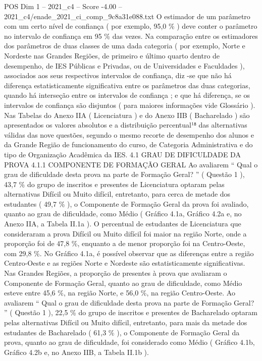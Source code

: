 \begin{textsample}{POS Dim 1 – 2021\_c4 – Score -4.00 – 2021\_c4/enade\_2021\_ci\_comp\_9c8a31e088.txt}
O estimador de um parâmetro com um certo nível de confiança ( por exemplo, 95,0 \% ) deve conter o parâmetro no intervalo de confiança em 95 \% das vezes.
Na comparação entre os estimadores dos parâmetros de duas classes de uma dada categoria ( por exemplo, Norte e Nordeste nas Grandes Regiões, de primeiro e último quarto dentro de desempenho, de IES Públicas e Privadas, ou de Universidades e Faculdades ), associados aos seus respectivos intervalos de confiança, diz -se que não há diferença estatisticamente significativa entre os parâmetros das duas categorias, quando há interseção entre os intervalos de confiança ; e que há diferença, se os intervalos de confiança são disjuntos ( para maiores informações vide Glossário ).
Nas Tabelas do Anexo IIA ( Licenciatura ) e do Anexo IIB ( Bacharelado ) são apresentados os valores absolutos e a distribuição percentual¹⁸ das alternativas válidas das nove questões, segundo o mesmo recorte de desempenho dos alunos e da Grande Região de funcionamento do curso, de Categoria Administrativa e do tipo de Organização Acadêmica da IES. 4.1 GRAU DE DIFICULDADE DA PROVA 4.1.1 COMPONENTE DE FORMAÇÃO GERAL Ao avaliarem “ Qual o grau de dificuldade desta prova na parte de Formação Geral? ” ( Questão 1 ), 43,7 \% do grupo de inscritos e presentes de Licenciatura optaram pelas alternativas Difícil ou Muito difícil, entretanto, para cerca de metade dos estudantes ( 49,7 \% ), o Componente de Formação Geral da prova foi avaliado, quanto ao grau de dificuldade, como Médio ( Gráfico 4.1a, Gráfico 4.2a e, no Anexo IIA, a Tabela II.1a ).
O percentual de estudantes de Licenciatura que consideraram a prova Difícil ou Muito difícil foi maior na região Norte, onde a proporção foi de 47,8 \%, enquanto a de menor proporção foi na Centro-Oeste, com 29,8 \%.
No Gráfico 4.1a, é possível observar que as diferenças entre a região Centro-Oeste e as regiões Norte e Nordeste são estatisticamente significativas.
Nas Grandes Regiões, a proporção de presentes à prova que avaliaram o Componente de Formação Geral, quanto ao grau de dificuldade, como Médio esteve entre 45,6 \%, na região Norte, e 56,0 \%, na região Centro-Oeste.
Ao avaliarem “ Qual o grau de dificuldade desta prova na parte de Formação Geral? ” ( Questão 1 ), 22,5 \% do grupo de inscritos e presentes de Bacharelado optaram pelas alternativas Difícil ou Muito difícil, entretanto, para mais da metade dos estudantes de Bacharelado ( 61,3 \% ), o Componente de Formação Geral da prova, quanto ao grau de dificuldade, foi considerado como Médio ( Gráfico 4.1b, Gráfico 4.2b e, no Anexo IIB, a Tabela II.1b ).

\end{textsample}
